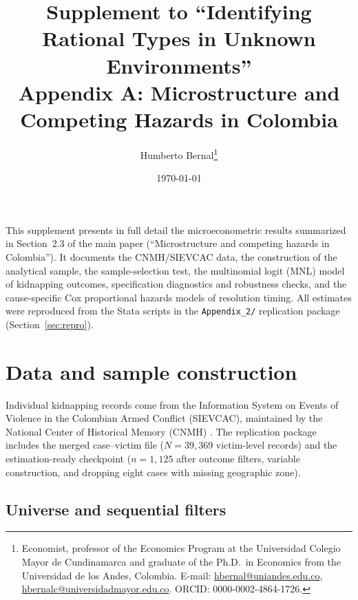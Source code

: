 \documentclass[12pt]{article}
\numberwithin{equation}{section}
\numberwithin{table}{section}
\begin{document}
\title{Supplement to ``Identifying Rational Types in Unknown Environments''\\
Appendix A: Microstructure and Competing Hazards in Colombia}
\author{Humberto Bernal\thanks{Economist, professor of the Economics Program at the Universidad Colegio Mayor de Cundinamarca and graduate of the Ph.D.\ in Economics from the Universidad de los Andes, Colombia. E-mail: \href{mailto:hbernal@uniandes.edu.co}{hbernal@uniandes.edu.co}, \href{mailto:hbernalc@universidadmayor.edu.co}{hbernalc@universidadmayor.edu.co}. ORCID: 0000-0002-4864-1726.}}
\date{\today}
\maketitle

\newpage

\noindent
This supplement presents in full detail the microeconometric results
summarized in Section~2.3 of the main paper (``Microstructure and competing
hazards in Colombia''). It documents the CNMH/SIEVCAC data, the construction
of the analytical sample, the sample-selection test, the multinomial logit
(MNL) model of kidnapping outcomes, specification diagnostics and robustness
checks, and the cause-specific Cox proportional hazards models of resolution
timing. All estimates were reproduced from the Stata scripts in the
\texttt{Appendix\_2/} replication package (Section~\ref{sec:repro}).

\section{Data and sample construction}
\label{sec:data}

Individual kidnapping records come from the Information System on Events of
Violence in the Colombian Armed Conflict (SIEVCAC), maintained by the
National Center of Historical Memory (CNMH) \citep{cnmh_datos,CNMH2013}.
The replication package includes the merged case--victim file
 ($N=39{,}369$ victim-level records) and the
estimation-ready checkpoint  ($n=1{,}125$
after outcome filters, variable construction, and dropping eight cases with
missing geographic zone).

\subsection{Universe and sequential filters}
\end{document}
